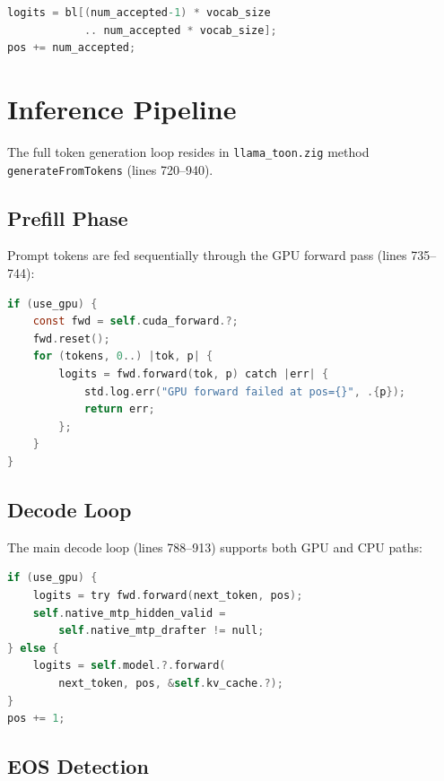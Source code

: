 \documentclass[11pt]{article}
\begin{document}
\begin{lstlisting}[language=C,caption={Logits reuse (llama\_toon.zig:868--869)}]
logits = bl[(num_accepted-1) * vocab_size
            .. num_accepted * vocab_size];
pos += num_accepted;
\end{lstlisting}

\section{Inference Pipeline}
\label{sec:inference}

The full token generation loop resides in \texttt{llama\_toon.zig} method
\texttt{generateFromTokens} (lines 720--940).

\subsection{Prefill Phase}

Prompt tokens are fed sequentially through the GPU forward pass (lines 735--744):

\begin{lstlisting}[language=C,caption={GPU prefill (llama\_toon.zig:735--744)}]
if (use_gpu) {
    const fwd = self.cuda_forward.?;
    fwd.reset();
    for (tokens, 0..) |tok, p| {
        logits = fwd.forward(tok, p) catch |err| {
            std.log.err("GPU forward failed at pos={}", .{p});
            return err;
        };
    }
}
\end{lstlisting}

\subsection{Decode Loop}

The main decode loop (lines 788--913) supports both GPU and CPU paths:

\begin{lstlisting}[language=C,caption={GPU/CPU forward dispatch (llama\_toon.zig:886--892)}]
if (use_gpu) {
    logits = try fwd.forward(next_token, pos);
    self.native_mtp_hidden_valid =
        self.native_mtp_drafter != null;
} else {
    logits = self.model.?.forward(
        next_token, pos, &self.kv_cache.?);
}
pos += 1;
\end{lstlisting}

\subsection{EOS Detection}
\end{document}
